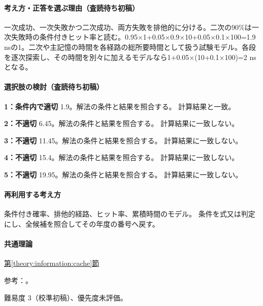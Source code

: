 \paragraph{考え方・正答を選ぶ理由（査読待ち初稿）} 一次成功、一次失敗かつ二次成功、両方失敗を排他的に分ける。二次の90\%は一次失敗時の条件付きヒット率と読む。0.95×1+0.05×0.9×10+0.05×0.1×100=\allowbreak{}1.9 nsの1。二次や主記憶の時間を各経路の総所要時間として扱う試験モデル。各段を逐次探索し、その時間を別々に加えるモデルなら1+0.05×(10+0.1×100)=\allowbreak{}2 nsとなる。

\paragraph{選択肢の検討（査読待ち初稿）}\mbox{}\par

\noindent\textbf{1：条件内で適切} 1.9。解法の条件と結果を照合する。 計算結果と一致。\par

\noindent\textbf{2：不適切} 6.45。解法の条件と結果を照合する。 計算結果に一致しない。\par

\noindent\textbf{3：不適切} 11.45。解法の条件と結果を照合する。 計算結果に一致しない。\par

\noindent\textbf{4：不適切} 15.4。解法の条件と結果を照合する。 計算結果に一致しない。\par

\noindent\textbf{5：不適切} 19.95。解法の条件と結果を照合する。 計算結果に一致しない。\par

\paragraph{再利用する考え方} 条件付き確率、排他的経路、ヒット率、累積時間のモデル。 条件を式又は判定にし、全候補を照合してその年度の番号へ戻す。

\paragraph{共通理論} \hyperref[theory:information:cache]{第\ref*{theory:information:cache}節}

\par 参考：\cite{info_cache}。

\par 難易度 3（校準初稿）、優先度未評価。

